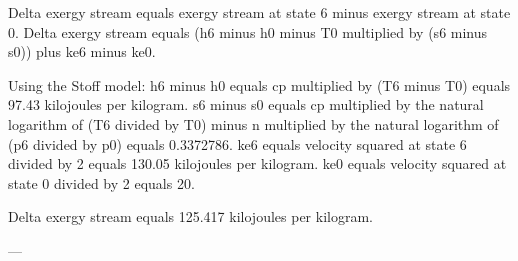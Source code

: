 Delta exergy stream equals exergy stream at state 6 minus exergy stream at state 0.  
Delta exergy stream equals (h6 minus h0 minus T0 multiplied by (s6 minus s0)) plus ke6 minus ke0.  

Using the Stoff model:  
h6 minus h0 equals cp multiplied by (T6 minus T0) equals 97.43 kilojoules per kilogram.  
s6 minus s0 equals cp multiplied by the natural logarithm of (T6 divided by T0) minus n multiplied by the natural logarithm of (p6 divided by p0) equals 0.3372786.  
ke6 equals velocity squared at state 6 divided by 2 equals 130.05 kilojoules per kilogram.  
ke0 equals velocity squared at state 0 divided by 2 equals 20.  

Delta exergy stream equals 125.417 kilojoules per kilogram.  

---